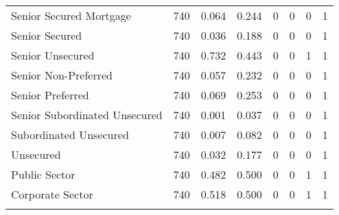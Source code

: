 \begin{table}[!htbp]
\begin{tabular}{@{\extracolsep{5pt}}lccccccc}
Senior Secured Mortgage & 740 & 0.064 & 0.244 & 0 & 0 & 0 & 1 \\ 
Senior Secured & 740 & 0.036 & 0.188 & 0 & 0 & 0 & 1 \\ 
Senior Unsecured & 740 & 0.732 & 0.443 & 0 & 0 & 1 & 1 \\ 
Senior Non-Preferred & 740 & 0.057 & 0.232 & 0 & 0 & 0 & 1 \\ 
Senior Preferred & 740 & 0.069 & 0.253 & 0 & 0 & 0 & 1 \\ 
Senior Subordinated Unsecured & 740 & 0.001 & 0.037 & 0 & 0 & 0 & 1 \\ 
Subordinated Unsecured & 740 & 0.007 & 0.082 & 0 & 0 & 0 & 1 \\ 
Unsecured & 740 & 0.032 & 0.177 & 0 & 0 & 0 & 1 \\ 
Public Sector & 740 & 0.482 & 0.500 & 0 & 0 & 1 & 1 \\ 
Corporate Sector & 740 & 0.518 & 0.500 & 0 & 0 & 1 & 1 \\ 
\hline \\[-1.8ex] 
\end{tabular} 
\end{table}

